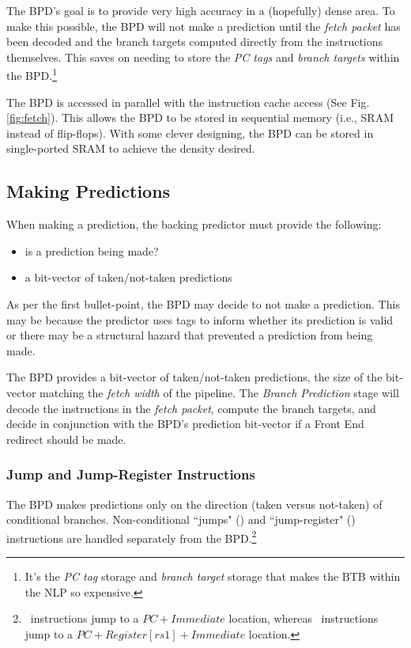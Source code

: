 The BPD's goal is to provide very high accuracy in a (hopefully) dense area.  To make this possible, the BPD will not make a prediction until the {\em fetch packet} has been decoded and the branch targets computed directly from the instructions themselves.  This saves on needing to store the {\em PC tags} and {\em branch targets} within the BPD.\footnote{It's the {\em PC tag} storage and {\em branch target} storage that makes the BTB within the NLP so expensive.}

The BPD is accessed in parallel with the instruction cache access (See Fig. \ref{fig:fetch}).  This allows the BPD to be stored in sequential memory (i.e., SRAM instead of flip-flops). With some clever designing, the BPD can be stored in single-ported SRAM to achieve the density desired.\cite{ev8}

\subsection{Making Predictions}

When making a prediction, the backing predictor must provide the following:

\begin{itemize}
\item is a prediction being made?
\item a bit-vector of taken/not-taken predictions
\end{itemize}

As per the first bullet-point, the BPD may decide to not make a prediction. This may be because the predictor uses tags to inform whether its prediction is valid or there may be a structural hazard that prevented a prediction from being made.

The BPD provides a bit-vector of taken/not-taken predictions, the size of the bit-vector matching the {\em fetch width} of the pipeline. The {\em Branch Prediction} stage will decode the instructions in the {\em fetch packet}, compute the branch targets, and decide in conjunction with the BPD's prediction bit-vector if a Front End redirect should be made. 

\subsubsection{Jump and Jump-Register Instructions}

The BPD makes predictions only on the direction (taken versus not-taken) of conditional branches.  Non-conditional ``jumps" (\jal) and ``jump-register" (\jalr) instructions are handled separately from the BPD.\footnote{\jal\ instructions jump to a $PC+Immediate$ location, whereas \jalr\ instructions jump to a $PC+Register[rs1]+Immediate$ location.}

